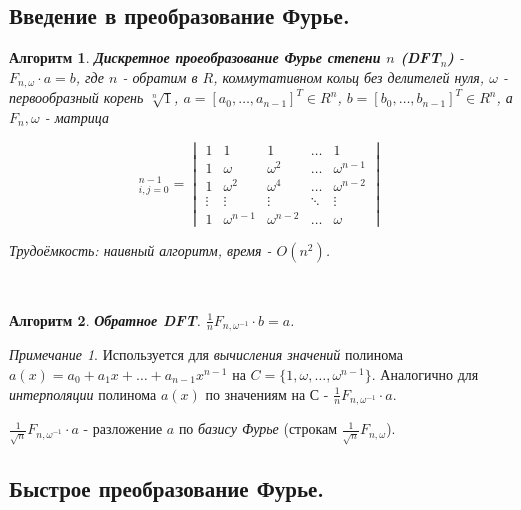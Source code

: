 \documentclass[a4paper]{article}
\theoremstyle{indented}
\newtheorem{alg}{Алгоритм}
\theoremstyle{definition}
\theoremstyle{remark}
\newtheorem{remark}{Примечание}
\begin{document}
\subsection{Введение в преобразование Фурье.}

\begin{alg}
    \textbf{Дискретное проеобразование Фурье степени $n$ (DFT$_n$)} - $F_{n, \omega}\cdot a = b$, где $n$ - обратим в $R$, коммутативном кольц без делителей нуля, $\omega$ - первообразный корень $\sqrt[n]{1}$, $a=[a_0, \ldots, a_{n-1}]^T\in R^n$, $b=[b_0, \ldots, b_{n-1}]^T\in R^n$, а $F_n, \omega$ - матрица
    
    \begin{equation*}
        [\omega^{ij}]_{i, j=0}^{n-1}=
        \begin{vmatrix}
            1 & 1 & 1 & \dots & 1 \\
            1 & \omega & \omega^2 & \dots & \omega^{n-1} \\
            1 & \omega^2 & \omega^4 & \dots & \omega^{n-2} \\
            \vdots & \vdots & \vdots & \ddots & \vdots \\
            1 & \omega^{n-1} & \omega^{n-2} & \dots & \omega 
        \end{vmatrix}
    \end{equation*}

    Трудоёмкость: наивный алгоритм, время - $O(n^2)$. 
\end{alg} \

\begin{alg}
    \textbf{Обратное DFT}. $\frac{1}{n}F_{n, \omega^{-1}}\cdot b = a$.
\end{alg}

\begin{remark}
    Используется для \textit{вычисления значений} полинома $a(x)=a_0+a_1x+\ldots+a_{n-1}x^{n-1}$ на $C=\{1, \omega, \ldots, \omega^{n-1}\}$. Аналогично для \textit{интерполяции} полинома $a(x)$ по значениям на $С$ - $\frac{1}{n}F_{n, \omega^{-1}}\cdot a$. \ 

    $\frac{1}{\sqrt{n}}F_{n, \omega^{-1}}\cdot a$ - разложение $a$ по \textit{базису Фурье} (строкам $\frac{1}{\sqrt{n}}F_{n, \omega}$). 
\end{remark}

\subsection{Быстрое преобразование Фурье.}
\end{document}
